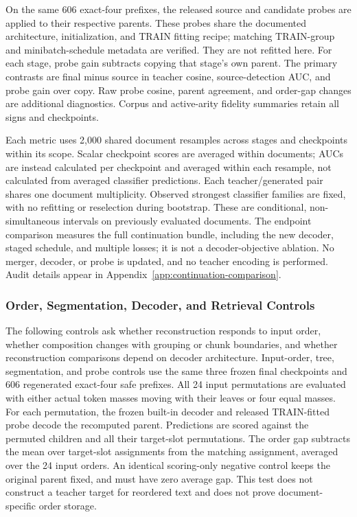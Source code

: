 \documentclass[10pt]{article}
\begin{document}
On the same 606 exact-four prefixes, the released source and candidate probes
are applied to their respective parents. These probes share the documented
architecture, initialization, and TRAIN fitting recipe; matching TRAIN-group
and minibatch-schedule metadata are verified. They are not refitted here.
For each stage, probe gain subtracts copying that stage's own parent. The
primary contrasts are final minus source in teacher cosine, source-detection AUC, and
probe gain over copy. Raw probe cosine, parent agreement, and order-gap changes
are additional diagnostics. Corpus and active-arity fidelity summaries retain
all signs and checkpoints.

Each metric uses 2,000 shared document resamples across stages and checkpoints
within its scope. Scalar checkpoint scores are averaged within documents;
AUCs are instead calculated per checkpoint and averaged within each resample,
not calculated from averaged classifier predictions. Each teacher/generated
pair shares one document multiplicity. Observed strongest classifier families
are fixed, with no refitting or reselection during bootstrap. These are
conditional, non-simultaneous intervals on previously evaluated documents.
The endpoint comparison measures the full continuation bundle, including the
new decoder, staged schedule, and multiple losses; it is not a decoder-objective
ablation. No merger, decoder, or probe is updated, and no teacher encoding is
performed. Audit details appear in Appendix~\ref{app:continuation-comparison}.

\subsubsection{Order, Segmentation, Decoder, and Retrieval Controls}
\label{sec:extended-review-protocol}

The following controls ask whether reconstruction responds to input order,
whether composition changes with grouping or chunk boundaries, and whether
reconstruction comparisons depend on decoder architecture. Input-order, tree,
segmentation, and probe controls use the same three frozen final checkpoints
and 606 regenerated exact-four safe prefixes. All 24 input permutations are evaluated
with either actual token masses moving with their leaves or four equal masses.
For each permutation, the frozen built-in decoder and released TRAIN-fitted
probe decode the recomputed parent. Predictions are scored against the
permuted children and all their target-slot permutations.
The order gap subtracts the mean over target-slot assignments from the
matching assignment, averaged over the 24 input orders. An identical
scoring-only negative control keeps the original parent fixed, and must have
zero average gap. This test does not construct a teacher target for reordered
text and does not prove document-specific order storage.
\end{document}
